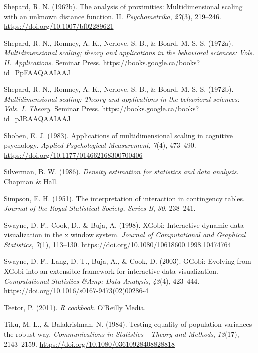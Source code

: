 \documentclass[
  letterpaper,
  10pt,
  krantz2]{krantz}
\newlength{\cslhangindent}
\newenvironment{CSLReferences}[2] %
 {\begin{list}{}{%
  \setlength{\itemindent}{0pt}
  \setlength{\leftmargin}{0pt}
  \setlength{\parsep}{0pt}
  \ifodd #1
   \setlength{\leftmargin}{\cslhangindent}
   \setlength{\itemindent}{-1\cslhangindent}
  \fi
  \setlength{\itemsep}{#2\baselineskip}}}
 {\end{list}}
\begin{document}
\begin{CSLReferences}{1}{0}
Shepard, R. N. (1962b). The analysis of proximities: Multidimensional
scaling with an unknown distance function. II. \emph{Psychometrika},
\emph{27}(3), 219--246. \url{https://doi.org/10.1007/bf02289621}

Shepard, R. N., Romney, A. K., Nerlove, S. B., \& Board, M. S. S.
(1972a). \emph{Multidimensional scaling; theory and applications in the
behavioral sciences: Vols. II. Applications}. Seminar Press.
\url{https://books.google.ca/books?id=PpFAAQAAIAAJ}

Shepard, R. N., Romney, A. K., Nerlove, S. B., \& Board, M. S. S.
(1972b). \emph{Multidimensional scaling: Theory and applications in the
behavioral sciences: Vols. I. Theory}. Seminar Press.
\url{https://books.google.ca/books?id=pJRAAQAAIAAJ}

Shoben, E. J. (1983). Applications of multidimensional scaling in
cognitive psychology. \emph{Applied Psychological Measurement},
\emph{7}(4), 473--490. \url{https://doi.org/10.1177/014662168300700406}

Silverman, B. W. (1986). \emph{Density estimation for statistics and
data analysis}. Chapman \& Hall.

Simpson, E. H. (1951). The interpretation of interaction in contingency
tables. \emph{Journal of the Royal Statistical Society, Series B},
\emph{30}, 238--241.

Swayne, D. F., Cook, D., \& Buja, A. (1998). XGobi: Interactive dynamic
data visualization in the x window system. \emph{Journal of
Computational and Graphical Statistics}, \emph{7}(1), 113--130.
\url{https://doi.org/10.1080/10618600.1998.10474764}

Swayne, D. F., Lang, D. T., Buja, A., \& Cook, D. (2003). {GGobi}:
Evolving from {XGobi} into an extensible framework for interactive data
visualization. \emph{Computational Statistics \&Amp; Data Analysis},
\emph{43}(4), 423--444.
\url{https://doi.org/10.1016/s0167-9473(02)00286-4}

Teetor, P. (2011). \emph{{R cookbook}}. {O'Reilly} Media.

Tiku, M. L., \& Balakrishnan, N. (1984). Testing equality of population
variances the robust way. \emph{Communications in Statistics - Theory
and Methods}, \emph{13}(17), 2143--2159.
\url{https://doi.org/10.1080/03610928408828818}


\end{CSLReferences}
\end{document}
